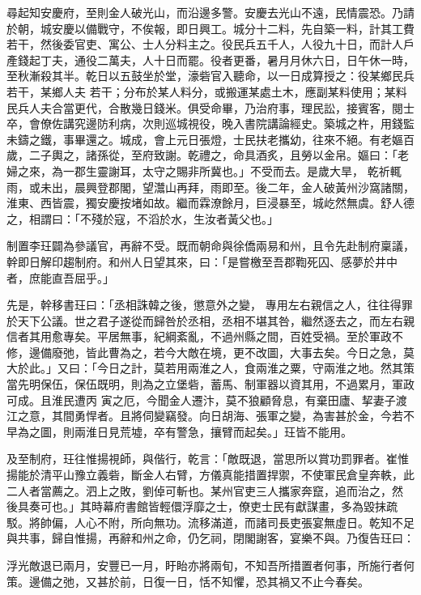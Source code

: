 \begin{pinyinscope}
 尋起知安慶府，至則金人破光山，而沿邊多警。安慶去光山不遠，民情震恐。乃請於朝，城安慶以備戰守，不俟報，即日興工。城分十二料，先自築一料，計其工費若干，然後委官吏、寓公、士人分料主之。役民兵五千人，人役九十日，而計人戶產錢起丁夫，通役二萬夫，人十日而罷。役者更番，暑月月休六日，日午休一時，至秋漸殺其半。乾日以五鼓坐於堂，濠砦官入聽命，以一日成算授之：役某鄉民兵若干，某鄉人夫
 若干；分布於某人料分，或搬運某處土木，應副某料使用；某料民兵人夫合當更代，合散幾日錢米。俱受命畢，乃治府事，理民訟，接賓客，閱士卒，會僚佐講究邊防利病，次則巡城視役，晚入書院講論經史。築城之杵，用錢監未鑄之鐵，事畢還之。城成，會上元日張燈，士民扶老攜幼，往來不絕。有老嫗百歲，二子輿之，諸孫從，至府致謝。乾禮之，命具酒炙，且勞以金帛。嫗曰：「老婦之來，為一郡生靈謝耳，太守之賜非所冀也。」不受而去。是歲大旱，
 乾祈輒雨，或未出，晨興登郡閣，望灊山再拜，雨即至。後二年，金人破黃州沙窩諸關，淮東、西皆震，獨安慶按堵如故。繼而霖潦餘月，巨浸暴至，城屹然無虞。舒人德之，相謂曰：「不殘於寇，不滔於水，生汝者黃父也。」



 制置李玨闢為參議官，再辭不受。既而朝命與徐僑兩易和州，且令先赴制府稟議，幹即日解印趨制府。和州人日望其來，曰：「是嘗檄至吾郡鞫死囚、感夢於井中者，庶能直吾屈乎。」



 先是，幹移書玨曰：「丞相誅韓之後，懲意外之變，
 專用左右親信之人，往往得罪於天下公議。世之君子遂從而歸咎於丞相，丞相不堪其咎，繼然逐去之，而左右親信者其用愈專矣。平居無事，紀綱紊亂，不過州縣之間，百姓受禍。至於軍政不修，邊備廢弛，皆此曹為之，若今大敵在境，更不改圖，大事去矣。今日之急，莫大於此。」又曰：「今日之計，莫若用兩淮之人，食兩淮之粟，守兩淮之地。然其策當先明保伍，保伍既明，則為之立堡砦，蓄馬、制軍器以資其用，不過累月，軍政可成。且淮民遭丙
 寅之厄，今聞金人遷汴，莫不狼顧脅息，有棄田廬、挈妻子渡江之意，其間勇悍者。且將伺變竊發。向日胡海、張軍之變，為害甚於金，今若不早為之圖，則兩淮日見荒墟，卒有警急，攘臂而起矣。」玨皆不能用。



 及至制府，玨往惟揚視師，與偕行，乾言：「敵既退，當思所以賞功罰罪者。崔惟揚能於清平山豫立義砦，斷金人右臂，方儀真能措置捍禦，不使軍民倉皇奔軼，此二人者當薦之。泗上之敗，劉倬可斬也。某州官吏三人攜家奔竄，追而治之，然
 後具奏可也。」其時幕府書館皆輕儇浮靡之士，僚吏士民有獻謀畫，多為毀抹疏駁。將帥偏，人心不附，所向無功。流移滿道，而諸司長吏張宴無虛日。乾知不足與共事，歸自惟揚，再辭和州之命，仍乞祠，閉閣謝客，宴樂不與。乃復告玨曰：



 浮光敵退已兩月，安豐已一月，盱眙亦將兩旬，不知吾所措置者何事，所施行者何策。邊備之弛，又甚於前，日復一日，恬不知懼，恐其禍又不止今春矣。




\end{pinyinscope}
